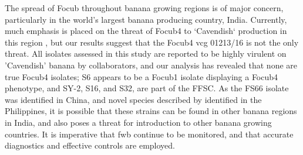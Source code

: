 The spread of \ac{Focub} throughout banana growing regions is of major concern, particularly in the world's largest banana producing country, India. Currently, much emphasis is placed on the threat of \ac{Focub4} to `Cavendish` production in this region \parencite{Viljoen2020, Damodaran2019}, but our results suggest that the \ac{Focub4} \ac{vcg} 01213/16 is not the only threat. All isolates assessed in this study are reported to be highly virulent on 'Cavendish' banana by collaborators, and our analysis has revealed that none are true \ac{Focub4} isolates; S6 appears to be a \ac{Focub1} isolate displaying a \ac{Focub4} phenotype, and SY-2, S16, and S32, are part of the \ac{FFSC}. As the FS66 isolate was identified in China, and novel species described by \textcite{Nozawa2023} identified in the Philippines, it is possible that these strains can be found in other banana regions in India, and also poses a threat for introduction to other banana growing countries. It is imperative that \ac{fwb} continue to be monitored, and that accurate diagnostics and effective controls are employed. 
